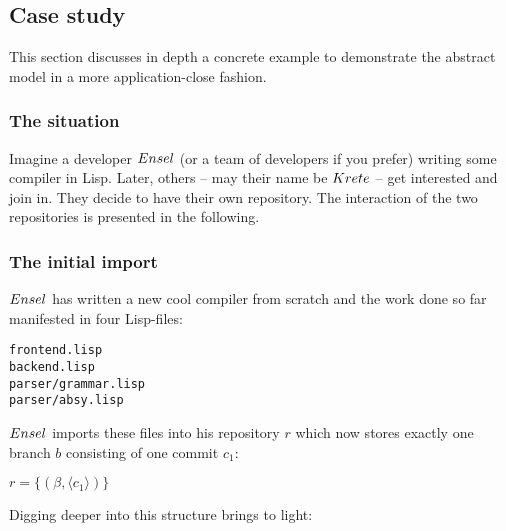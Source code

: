 \documentclass[fleqn, 10pt, a4paper]{report} \usepackage{amssymb}
\begin{document}
\subsection{Case study}

This section discusses in depth a concrete example to demonstrate the
abstract model in a more application-close fashion.

\subsubsection{The situation}

Imagine a developer $\mathnormal{Ensel}$ (or a team of developers if
you prefer) writing some compiler in Lisp. Later, others -- may their
name be $\mathnormal{Krete}$ -- get interested and join in.  They
decide to have their own repository. The interaction of the two
repositories is presented in the following.

\subsubsection{The initial import}

$\mathnormal{Ensel}$ has written a new cool compiler from scratch and
the work done so far manifested in four Lisp-files:

\begin{verbatim}
frontend.lisp
backend.lisp
parser/grammar.lisp
parser/absy.lisp
\end{verbatim}

$\mathnormal{Ensel}$ imports these files into his repository $r$ which
now stores exactly one branch $b$ consisting of one commit $c_1$:

$r=\{(\beta, \langle c_1\rangle)\}$

Digging deeper into this structure brings to light:
\end{document}
